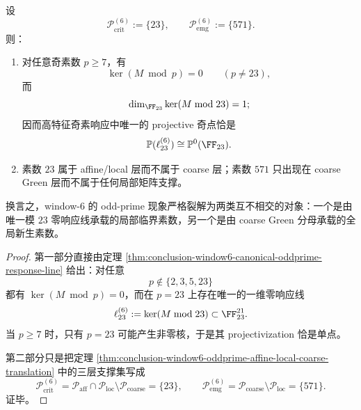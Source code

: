 \begin{corollary}\label{cor:conclusion-window6-critical-vs-emergent-oddprimes}
设
\[
\mathcal P_{\mathrm{crit}}^{(6)}:=\{23\},
\qquad
\mathcal P_{\mathrm{emg}}^{(6)}:=\{571\}.
\]
则：
\begin{enumerate}
  \item 对任意奇素数 \(p\ge 7\)，有
  \[
  \ker(M\bmod p)=0
  \qquad (p\neq 23),
  \]
  而
  \[
  \dim_{\FF_{23}}\ker(M\bmod 23)=1;
  \]
  因而高特征奇素响应中唯一的 projective 奇点恰是
  \[
  \mathbb P(\ell_{23}^{(6)})\cong \mathbb P^0(\FF_{23}).
  \]
  \item 素数 \(23\) 属于 affine/local 层而不属于 coarse 层；素数 \(571\) 只出现在 coarse Green 层而不属于任何局部矩阵支撑。
\end{enumerate}
换言之，window-\(6\) 的 odd-prime 现象严格裂解为两类互不相交的对象：一个是由唯一模 \(23\) 零响应线承载的局部临界素数，另一个是由 coarse Green 分母承载的全局新生素数。
\end{corollary}
\begin{proof}
第一部分直接由定理 \ref{thm:conclusion-window6-canonical-oddprime-response-line} 给出：对任意
\[
p\notin\{2,3,5,23\}
\]
都有 \(\ker(M\bmod p)=0\)，而在 \(p=23\) 上存在唯一的一维零响应线
\[
\ell_{23}^{(6)}:=\ker(M\bmod 23)\subset \FF_{23}^{21}.
\]
当 \(p\ge 7\) 时，只有 \(p=23\) 可能产生非零核，于是其 projectivization 恰是单点。

第二部分只是把定理 \ref{thm:conclusion-window6-oddprime-affine-local-coarse-translation} 中的三层支撑集写成
\[
\mathcal P_{\mathrm{crit}}^{(6)}=\mathcal P_{\mathrm{aff}}\cap \mathcal P_{\mathrm{loc}}\setminus \mathcal P_{\mathrm{coarse}}=\{23\},
\qquad
\mathcal P_{\mathrm{emg}}^{(6)}=\mathcal P_{\mathrm{coarse}}\setminus \mathcal P_{\mathrm{loc}}=\{571\}.
\]
证毕。
\end{proof}


